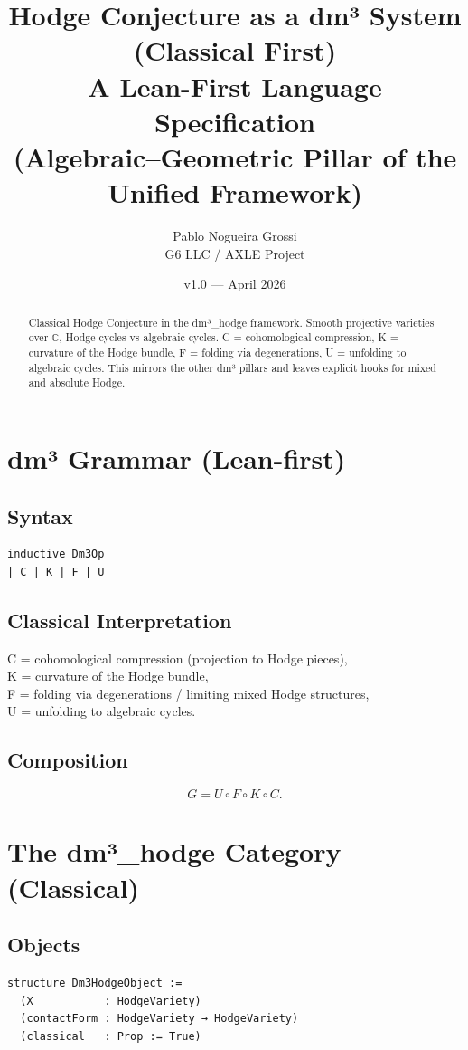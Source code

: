 \documentclass[11pt,a4paper]{article}
\title{\textbf{Hodge Conjecture as a dm³ System (Classical First)}\\
A Lean-First Language Specification \\
(Algebraic–Geometric Pillar of the Unified Framework)}
\author{Pablo Nogueira Grossi \\ G6 LLC / AXLE Project}
\date{v1.0 — April 2026}
\begin{document}
\maketitle

\begin{abstract}
Classical Hodge Conjecture in the dm³\_hodge framework.
Smooth projective varieties over $\mathbb{C}$, Hodge cycles vs algebraic cycles.
C = cohomological compression, K = curvature of the Hodge bundle,
F = folding via degenerations, U = unfolding to algebraic cycles.
This mirrors the other dm³ pillars and leaves explicit hooks for mixed and absolute Hodge.
\end{abstract}

\section{dm³ Grammar (Lean-first)}

\subsection{Syntax}
\begin{lstlisting}
inductive Dm3Op
| C | K | F | U
\end{lstlisting}

\subsection{Classical Interpretation}
C = cohomological compression (projection to Hodge pieces), \\
K = curvature of the Hodge bundle, \\
F = folding via degenerations / limiting mixed Hodge structures, \\
U = unfolding to algebraic cycles.

\subsection{Composition}
\[
G = U \circ F \circ K \circ C.
\]

\section{The dm³\_hodge Category (Classical)}

\subsection{Objects}
\begin{lstlisting}
structure Dm3HodgeObject :=
  (X           : HodgeVariety)
  (contactForm : HodgeVariety → HodgeVariety)
  (classical   : Prop := True)
\end{lstlisting}
\end{document}
